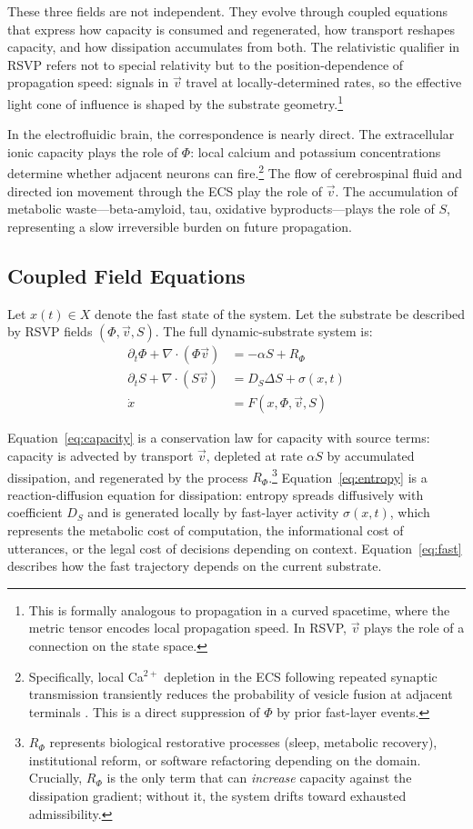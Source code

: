 \documentclass[12pt,a4paper]{article}
\begin{document}
These three fields are not independent. They evolve through coupled equations that express how capacity is consumed and regenerated, how transport reshapes capacity, and how dissipation accumulates from both. The relativistic qualifier in RSVP refers not to special relativity but to the position-dependence of propagation speed: signals in $\vec{v}$ travel at locally-determined rates, so the effective light cone of influence is shaped by the substrate geometry.\footnote{This is formally analogous to propagation in a curved spacetime, where the metric tensor encodes local propagation speed. In RSVP, $\vec{v}$ plays the role of a connection on the state space.}

In the electrofluidic brain, the correspondence is nearly direct. The extracellular ionic capacity plays the role of $\Phi$: local calcium and potassium concentrations determine whether adjacent neurons can fire.\footnote{Specifically, local Ca$^{2+}$ depletion in the ECS following repeated synaptic transmission transiently reduces the probability of vesicle fusion at adjacent terminals \cite{chakravarthy2026}. This is a direct suppression of $\Phi$ by prior fast-layer events.} The flow of cerebrospinal fluid and directed ion movement through the ECS play the role of $\vec{v}$. The accumulation of metabolic waste---beta-amyloid, tau, oxidative byproducts---plays the role of $S$, representing a slow irreversible burden on future propagation.

\subsection{Coupled Field Equations}

Let $x(t) \in X$ denote the fast state of the system. Let the substrate be described by RSVP fields $(\Phi, \vec{v}, S)$. The full dynamic-substrate system is:
\begin{align}
\partial_t \Phi + \nabla \cdot (\Phi \vec{v}) &= -\alpha S + R_\Phi \label{eq:capacity}\\
\partial_t S + \nabla \cdot (S \vec{v}) &= D_S \Delta S + \sigma(x,t) \label{eq:entropy}\\
\dot{x} &= F(x, \Phi, \vec{v}, S) \label{eq:fast}
\end{align}

Equation~\eqref{eq:capacity} is a conservation law for capacity with source terms: capacity is advected by transport $\vec{v}$, depleted at rate $\alpha S$ by accumulated dissipation, and regenerated by the process $R_\Phi$.\footnote{$R_\Phi$ represents biological restorative processes (sleep, metabolic recovery), institutional reform, or software refactoring depending on the domain. Crucially, $R_\Phi$ is the only term that can \emph{increase} capacity against the dissipation gradient; without it, the system drifts toward exhausted admissibility.} Equation~\eqref{eq:entropy} is a reaction-diffusion equation for dissipation: entropy spreads diffusively with coefficient $D_S$ and is generated locally by fast-layer activity $\sigma(x,t)$, which represents the metabolic cost of computation, the informational cost of utterances, or the legal cost of decisions depending on context. Equation~\eqref{eq:fast} describes how the fast trajectory depends on the current substrate.
\end{document}
